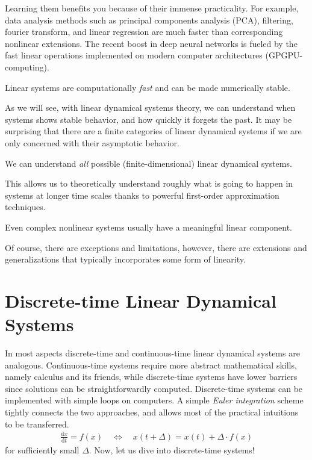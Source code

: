 \documentclass[a4paper,11pt]{exam}
\newcounter{ct}
\begin{document}
Learning them benefits you because of their immense practicality.
For example, data analysis methods such as principal components analysis (PCA), filtering, fourier transform, and linear regression are much faster than corresponding nonlinear extensions.
The recent boost in deep neural networks is fueled by the fast linear operations implemented on modern computer architectures (GPGPU-computing).
\begin{tcolorbox}[colback=black!1!,title=Saves you time and the planet]
    Linear systems are computationally \emph{fast} and can be made numerically stable.
\end{tcolorbox}
As we will see, with linear dynamical systems theory, we can understand when systems shows stable behavior, and how quickly it forgets the past.
It may be surprising that there are a finite categories of linear dynamical systems if we are only concerned with their asymptotic behavior.
\begin{tcolorbox}[colback=black!1!,title=Easy asymptotic theory]
    We can understand \emph{all} possible (finite-dimensional) linear dynamical systems.
\end{tcolorbox}
This allows us to theoretically understand roughly what is going to happen in systems at longer time scales thanks to powerful first-order approximation techniques.
\begin{tcolorbox}[colback=black!1!,title=Linearize (locally)]
    Even complex nonlinear systems usually have a meaningful linear component.
\end{tcolorbox}
Of course, there are exceptions and limitations, however, there are extensions and generalizations that typically incorporates some form of linearity.

\section{Discrete-time Linear Dynamical Systems}
In most aspects discrete-time and continuous-time linear dynamical systems are analogous.
Continuous-time systems require more abstract mathematical skills, namely calculus and its friends, while discrete-time systems have lower barriers since solutions can be straightforwardly computed.
Discrete-time systems can be implemented with simple loops on computers.
A simple \emph{Euler integration} scheme tightly connects the two approaches, and allows most of the practical intuitions to be transferred.
\begin{align}\label{eq:euler}
\frac{\mathrm{d}x}{\mathrm{d}t} = f(x) \quad \Longleftrightarrow \quad
x(t + \Delta) = x(t) + \Delta \cdot f(x)
\end{align}
for sufficiently small $\Delta$.
Now, let us dive into discrete-time systems!
\end{document}
